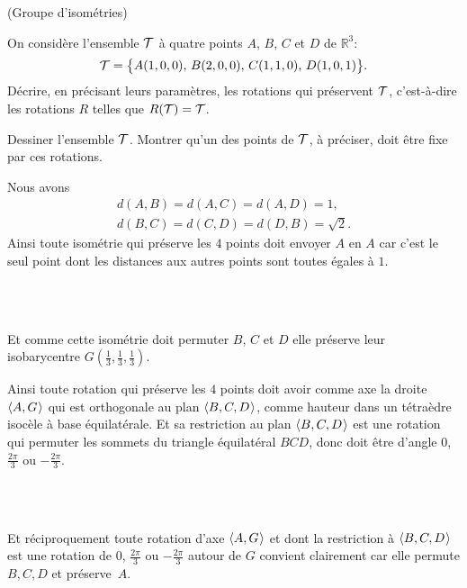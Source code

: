 \documentclass[a4paper,12pt,reqno]{amsart}
\begin{document}
\begin{exo} (Groupe d'isométries)

  On considère l'ensemble $\mathcal{T}$ à quatre points $A$, $B$, $C$ et $D$ de $\mathbb{R}^{3}$:
  \[
    \mathcal{T} = \big\{ A(1,0,0),\, B(2,0,0),\, C(1,1,0),\, D(1,0,1)\big\}.
  \]
  Décrire, en précisant leurs paramètres, les rotations qui préservent $\mathcal{T}$, c'est-à-dire les rotations $R$ telles que $R(\mathcal{T})=\mathcal{T}$.

  \begin{indication}
    Dessiner l'ensemble $\mathcal{T}$. Montrer qu'un des points de $\mathcal{T}$, à préciser, doit être fixe par ces rotations.
  \end{indication}
\end{exo}

\begin{solution}

  \begin{minipage}[t]{.70\linewidth}
    Nous avons
    \begin{gather*}
      d(A,B)=d(A,C)=d(A,D)=1, \\
      d(B,C)=d(C,D)=d(D,B)=\sqrt{2}.
    \end{gather*}
    Ainsi toute isométrie qui préserve les $4$ points doit envoyer $A$ en $A$ car c'est le seul point dont les distances aux autres points sont toutes égales à $1$.\\[-3mm]
  \end{minipage}\hfill
  \begin{minipage}[t]{.21\linewidth}~\\[21mm]
    \hspace*{\fill}
    \smash{\scalebox{.7}{}}
  \end{minipage}\\
  Et comme cette isométrie doit permuter $B$, $C$ et $D$ elle préserve leur isobarycentre $G(\frac{1}{3},\frac{1}{3},\frac{1}{3})$.
  \begin{minipage}[t]{.77\linewidth}
    Ainsi toute rotation qui préserve les $4$ points doit avoir comme axe la droite $\langle{A,G}\kern.07em\rangle$ qui est orthogonale au plan $\langle{B,C,D}\kern.07em\rangle$, comme hauteur dans un tétraèdre isocèle à base équilatérale. Et sa restriction au plan $\langle{B,C,D}\kern.07em\rangle$ est une rotation qui permuter les sommets du triangle équilatéral $BCD$, donc doit être d'angle $0$, $\frac{2\pi}{3}$ ou $-\frac{2\pi}{3}$.\\[-3mm]
  \end{minipage}\hfill
  \begin{minipage}[t]{.21\linewidth}~\\[19mm]
    \hspace*{\fill}
    \smash{\scalebox{.77}{}}
  \end{minipage}\\
  Et réciproquement toute rotation d'axe $\langle{A,G}\kern.07em\rangle$ et dont la restriction à $\langle{B,C,D}\kern.07em\rangle$ est une rotation de $0$, $\frac{2\pi}{3}$ ou $-\frac{2\pi}{3}$ autour de $G$ convient clairement car elle permute $B,C,D$ et préserve~$A$.
\end{solution}
\end{document}
